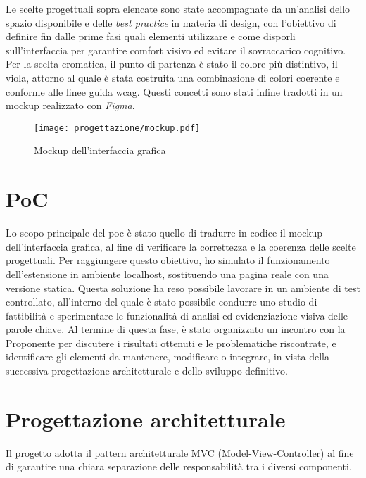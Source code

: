 \vspace{10pt}
\par\noindent Le scelte progettuali sopra elencate sono state accompagnate da un’analisi dello spazio disponibile e delle \textit{best practice} in materia di design, con l’obiettivo di definire fin dalle prime fasi quali elementi utilizzare e come disporli sull’interfaccia per garantire comfort visivo ed evitare il sovraccarico cognitivo. Per la scelta cromatica, il punto di partenza è stato il colore più distintivo, il viola, attorno al quale è stata costruita una combinazione di colori coerente e conforme alle linee guida \gls{wcag}. Questi concetti sono stati infine tradotti in un mockup realizzato con \textit{Figma}.

\begin{figure}[H]
    \centering 
    \texttt{[image: progettazione/mockup.pdf]} 
    \caption{Mockup dell'interfaccia grafica}
\end{figure}

\section{PoC}
\label{sec:poc}

\par Lo scopo principale del \gls{poc} è stato quello di tradurre in codice il mockup dell’interfaccia grafica, al fine di verificare la correttezza e la coerenza delle scelte progettuali. Per raggiungere questo obiettivo, ho simulato il funzionamento dell’estensione in ambiente \gls{localhost}, sostituendo una pagina reale con una versione statica. Questa soluzione ha reso possibile lavorare in un ambiente di test controllato, all’interno del quale è stato possibile condurre uno studio di fattibilità e sperimentare le funzionalità di analisi ed evidenziazione visiva delle parole chiave. Al termine di questa fase, è stato organizzato un incontro con la Proponente per discutere i risultati ottenuti e le problematiche riscontrate, e identificare gli elementi da mantenere, modificare o integrare, in vista della successiva progettazione architetturale e dello sviluppo definitivo.

\section{Progettazione architetturale}
\label{sec:progettazione}

\par Il progetto adotta il pattern architetturale MVC (Model-View-Controller) al fine di garantire una chiara separazione delle responsabilità tra i diversi componenti.

